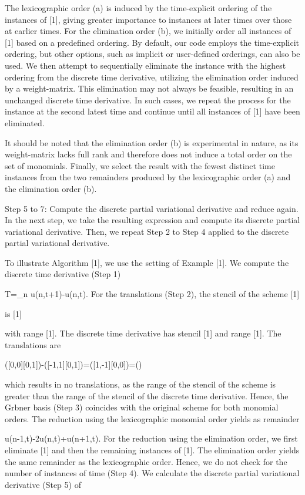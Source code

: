 \documentclass{article}
\begin{document}
{The lexicographic order (a) is induced by the time-explicit ordering of the instances of [1], giving greater importance to instances at later times over those at earlier times. For the elimination order (b), we initially order all instances of [1] based on a predefined ordering. By default, our code employs the time-explicit ordering, but other options, such as implicit or user-defined orderings, can also be used. We then attempt to sequentially eliminate the instance with the highest ordering from the discrete time derivative, utilizing the elimination order induced by a weight-matrix. This elimination may not always be feasible, resulting in an unchanged discrete time derivative. In such cases, we repeat the process for the instance at the second latest time and continue until all instances of [1] have been eliminated.

It should be noted that the elimination order (b) is experimental in nature, as its weight-matrix lacks full rank and therefore does not induce a total order on the set of monomials. Finally, we select the result with the fewest distinct time instances from the two remainders produced by the lexicographic order (a) and the elimination order (b).

 {Step 5 to 7: Compute the discrete partial variational derivative and reduce again.}
In the next step, we take the resulting expression and compute its discrete partial variational derivative. Then, we repeat Step 2 to Step 4 applied to the discrete partial variational derivative.

	
	To illustrate Algorithm [1], we use the setting of Example [1].
	We compute the discrete time derivative (Step 1)
	
		{T}=_{n} u(n,t+1)-u(n,t).
	For the translations (Step 2), the stencil of the scheme
	[1]
	
	is
	[1]
	
	with range [1].
	The discrete time derivative has stencil [1] 
	and range [1].
	The translations are
	
	
		([0,0][0,1])-([-1,1][0,1])=([1,-1][0,0])=(\times[0,0])
	
	
	which results in no translations, as the range of the stencil of the scheme is greater than the range of the stencil of the discrete time derivative.
	Hence, the Gr{}bner basis (Step 3) coincides with the original scheme for both monomial orders.
	The reduction using the lexicographic monomial order yields as remainder
	
		u(n-1,t)-2u(n,t)+u(n+1,t).
	For the reduction using the elimination order, we first eliminate [1] and then the remaining instances of [1].
	The elimination order yields the same remainder as the lexicographic order. Hence, we do not check for the number of instances of time (Step 4).
	We calculate the discrete partial variational derivative (Step 5) of
	
}
\end{document}
